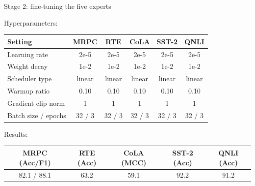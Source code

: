 \begin{frame}{Stage 2: fine-tuning the five experts}
  \raggedright\small Hyperparameters:\par\vspace{1mm}
  \centering\footnotesize
  \renewcommand{\arraystretch}{1.3}\begin{tabular}{|l|c|c|c|c|c|}
    \hline
    \textbf{Setting} & \textbf{MRPC} & \textbf{RTE} & \textbf{CoLA} & \textbf{SST-2} & \textbf{QNLI}\\ \hline
    Learning rate & 2e-5 & 2e-5 & 2e-5 & 2e-5 & 2e-5\\ \hline
    Weight decay & 1e-2 & 1e-2 & 1e-2 & 1e-2 & 1e-2\\ \hline
    Scheduler type & linear & linear & linear & linear & linear\\ \hline
    Warmup ratio & 0.10 & 0.10 & 0.10 & 0.10 & 0.10\\ \hline
    Gradient clip norm & 1 & 1 & 1 & 1 & 1\\ \hline
    Batch size / epochs & 32 / 3 & 32 / 3 & 32 / 3 & 32 / 3 & 32 / 3\\ \hline
  \end{tabular}
  \vfill
  \raggedright\small Results:\par\vspace{1mm}
  \centering\footnotesize
  \renewcommand{\arraystretch}{1.3}\begin{tabular}{|c|c|c|c|c|}
    \hline
    \textbf{MRPC (Acc/F1)} & \textbf{RTE (Acc)} & \textbf{CoLA (MCC)} & \textbf{SST-2 (Acc)} & \textbf{QNLI (Acc)}\\ \hline
    82.1 / 88.1 & 63.2 & 59.1 & 92.2 & 91.2\\ \hline
  \end{tabular}
\end{frame}


